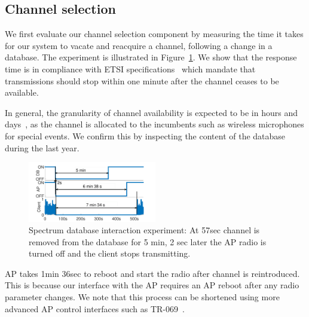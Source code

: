 \subsection{Channel selection}
\label{sec:database-eval}
We first evaluate our channel selection component by measuring the time it takes for our system to vacate and reacquire a channel, following a change in a database. The experiment is illustrated in Figure~\ref{fig:paws}.
We show that the response time is 
in compliance with ETSI specifications~\cite{etsi_tvws} which mandate that transmissions should stop within one minute after the channel ceases to be available.

In general, the granularity of channel availability is expected to be in hours and days~\cite{Rice_af}, as the channel is allocated to the incumbents such as wireless microphones for special events. We confirm this by inspecting the content of the database during the last year. 
 

\begin{figure}[htb!]
  \vskip -12pt
  \centering
  \hskip -8pt
    \includegraphics[width=0.5\textwidth]{./figs/paws.pdf}
  \vskip -6pt
  \caption{\small{Spectrum database interaction experiment: At 57sec channel is removed from the database for 5 min, 2 sec later the AP radio is turned off and the client stops transmitting.}}
  \label{fig:paws}
  \vskip -6pt
\end{figure}


AP takes 1min 36sec to reboot and start the radio after channel is reintroduced. This is because our interface with the AP requires an AP reboot after any radio parameter changes. We note that this process can be shortened using more advanced AP control interfaces such as TR-069~\cite{tr69}. 


